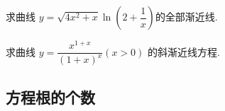 \documentclass[8pt a4paper, oneside, UTF8]{ctexbook}  %
\begin{document}
\begin{sloppypar}
\begin{solution}
    \end{solution}
    \begin{problem}
    求曲线 $y=\sqrt{4x^2+x}\ln\left(2+\dfrac1x\right)$的全部渐近线.
    \end{problem}
    \begin{solution}

    \end{solution}
    \begin{problem}
    求曲线 $y= \dfrac {x^{1+ x}}{\left ( 1+ x\right ) ^{x}}( x >0)$ 的斜渐近线方程.
    \end{problem}
    \begin{solution}
    \end{solution}
    \subsection{方程根的个数}
    \ifx\allfiles\undefined
\end{sloppypar}
\end{document}
